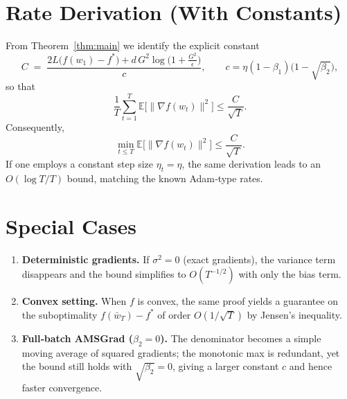 \documentclass{article}
\newcommand{\E}{\mathbb{E}}
\begin{document}
\section*{Rate Derivation (With Constants)}
From Theorem~\ref{thm:main} we identify the explicit constant
\[
C\;=\;\frac{2L\bigl(f(w_{1})-f^{*}\bigr)+d\,G^{2}\log\!\bigl(1+\frac{G^{2}}{\epsilon}\bigr)}{c},
\qquad
c=\eta(1-\beta_{1})\bigl(1-\sqrt{\beta_{2}}\bigr),
\]
so that
\[
\frac{1}{T}\sum_{t=1}^{T}\E\!\bigl[\|\nabla f(w_{t})\|^{2}\bigr]\le \frac{C}{\sqrt{T}}.
\]
Consequently,
\[
\min_{t\le T}\E\!\bigl[\|\nabla f(w_{t})\|^{2}\bigr]\le \frac{C}{\sqrt{T}}.
\]
If one employs a constant step size $\eta_{t}=\eta$, the same derivation leads to an $O(\log T/T)$ bound, matching the known Adam‑type rates.

\section*{Special Cases}
\begin{enumerate}[label=\alph*)]
\item \textbf{Deterministic gradients.} If $\sigma^{2}=0$ (exact gradients), the variance term disappears and the bound simplifies to $O(T^{-1/2})$ with only the bias term.
\item \textbf{Convex setting.} When $f$ is convex, the same proof yields a guarantee on the suboptimality $f(\bar w_{T})-f^{*}$ of order $O(1/\sqrt{T})$ by Jensen’s inequality.
\item \textbf{Full‑batch AMSGrad ($\beta_{2}=0$).} The denominator becomes a simple moving average of squared gradients; the monotonic max is redundant, yet the bound still holds with $\sqrt{\beta_{2}}=0$, giving a larger constant $c$ and hence faster convergence.
\end{enumerate}
\end{document}
